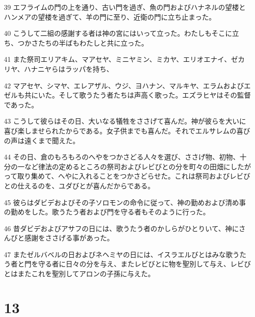\par 39 エフライムの門の上を通り、古い門を過ぎ、魚の門およびハナネルの望楼とハンメアの望楼を過ぎて、羊の門に至り、近衛の門に立ち止まった。
\par 40 こうして二組の感謝する者は神の宮にはいって立った。わたしもそこに立ち、つかさたちの半ばもわたしと共に立った。
\par 41 また祭司エリアキム、マアセヤ、ミニヤミン、ミカヤ、エリオエナイ、ゼカリヤ、ハナニヤらはラッパを持ち、
\par 42 マアセヤ、シマヤ、エレアザル、ウジ、ヨハナン、マルキヤ、エラムおよびエゼルも共にいた。そして歌うたう者たちは声高く歌った。エズラヒヤはその監督であった。
\par 43 こうして彼らはその日、大いなる犠牲をささげて喜んだ。神が彼らを大いに喜び楽しませられたからである。女子供までも喜んだ。それでエルサレムの喜びの声は遠くまで聞えた。
\par 44 その日、倉のもろもろのへやをつかさどる人々を選び、ささげ物、初物、十分の一など律法の定めるところの祭司およびレビびとの分を町々の田畑にしたがって取り集めて、へやに入れることをつかさどらせた。これは祭司およびレビびとの仕えるのを、ユダびとが喜んだからである。
\par 45 彼らはダビデおよびその子ソロモンの命令に従って、神の勤めおよび清め事の勤めをした。歌うたう者および門を守る者もそのように行った。
\par 46 昔ダビデおよびアサフの日には、歌うたう者のかしらがひとりいて、神にさんびと感謝をささげる事があった。
\par 47 またゼルバベルの日およびネヘミヤの日には、イスラエルびとはみな歌うたう者と門を守る者に日々の分を与え、またレビびとに物を聖別して与え、レビびとはまたこれを聖別してアロンの子孫に与えた。

\chapter{13}

